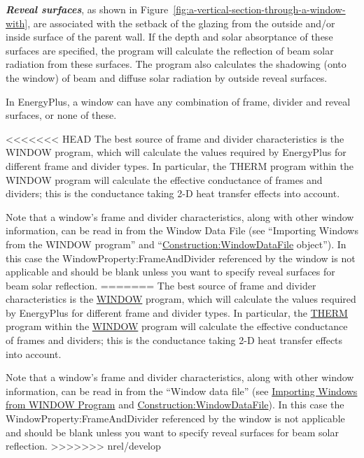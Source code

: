 \textbf{\emph{Reveal surfaces}}, as shown in Figure~\ref{fig:a-vertical-section-through-a-window-with}, are associated with the setback of the glazing from the outside and/or inside surface of the parent wall. If the depth and solar absorptance of these surfaces are specified, the program will calculate the reflection of beam solar radiation from these surfaces. The program also calculates the shadowing (onto the window) of beam and diffuse solar radiation by outside reveal surfaces.

In EnergyPlus, a window can have any combination of frame, divider and reveal surfaces, or none of these.

<<<<<<< HEAD
The best source of frame and divider characteristics is the WINDOW program, which will calculate the values required by EnergyPlus for different frame and divider types. In particular, the THERM program within the WINDOW program will calculate the effective conductance of frames and dividers; this is the conductance taking 2-D heat transfer effects into account.

Note that a window's frame and divider characteristics, along with other window information, can be read in from the Window Data File (see ``Importing Windows from the WINDOW program'' and ``\hyperref[constructionwindowdatafile]{Construction:WindowDataFile} object''). In this case the WindowProperty:FrameAndDivider referenced by the window is not applicable and should be blank unless you want to specify reveal surfaces for beam solar reflection.
=======
The best source of frame and divider characteristics is the \href{https://windows.lbl.gov/software-tools#window-heading}{WINDOW} program, which will calculate the values required by EnergyPlus for different frame and divider types. In particular, the \href{https://windows.lbl.gov/software-tools#therm-heading}{THERM} program within the \href{https://windows.lbl.gov/software-tools#window-heading}{WINDOW} program will calculate the effective conductance of frames and dividers; this is the conductance taking 2-D heat transfer effects into account.

Note that a window's frame and divider characteristics, along with other window information, can be read in from the ``Window data file'' (see \hyperref[importing-windows-from-window-program]{Importing Windows from WINDOW Program} and \hyperref[constructionwindowdatafile]{Construction:WindowDataFile}). In this case the WindowProperty:FrameAndDivider referenced by the window is not applicable and should be blank unless you want to specify reveal surfaces for beam solar reflection.
>>>>>>> nrel/develop

